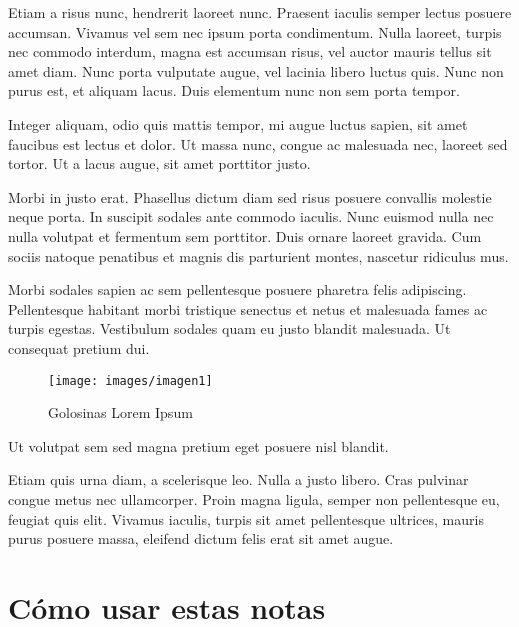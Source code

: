 \documentclass[12pt,a4paper]{report}
\begin{document}
Etiam a risus nunc, hendrerit laoreet nunc. Praesent iaculis semper lectus posuere accumsan. Vivamus vel sem nec ipsum porta condimentum. Nulla laoreet, turpis nec commodo interdum, magna est accumsan risus, vel auctor mauris tellus sit amet diam. Nunc porta vulputate augue, vel lacinia libero luctus quis. Nunc non purus est, et aliquam lacus. Duis elementum nunc non sem porta tempor.

Integer aliquam, odio quis mattis tempor, mi augue luctus sapien, sit amet faucibus est lectus et dolor. Ut massa nunc, congue ac malesuada nec, laoreet sed tortor. Ut a lacus augue, sit amet porttitor justo. 

Morbi in justo erat. Phasellus dictum diam sed risus posuere convallis molestie neque porta. In suscipit sodales ante commodo iaculis. Nunc euismod nulla nec nulla volutpat et fermentum sem porttitor. Duis ornare laoreet gravida. Cum sociis natoque penatibus et magnis dis parturient montes, nascetur ridiculus mus. 

Morbi sodales sapien ac sem pellentesque posuere pharetra felis adipiscing. Pellentesque habitant morbi tristique senectus et netus et malesuada fames ac turpis egestas. Vestibulum sodales quam eu justo blandit malesuada. Ut consequat pretium dui. 





\begin{figure}[h]
\centering
\texttt{[image: images/imagen1]}
\caption{Golosinas Lorem Ipsum}
\label{figure.golosinas}
\end{figure}





Ut volutpat sem sed magna pretium eget posuere nisl blandit.

Etiam quis urna diam, a scelerisque leo. Nulla a justo libero. Cras pulvinar congue metus nec ullamcorper. Proin magna ligula, semper non pellentesque eu, feugiat quis elit. Vivamus iaculis, turpis sit amet pellentesque ultrices, mauris purus posuere massa, eleifend dictum felis erat sit amet augue. 




\section{Cómo usar estas notas}
\label{seccion.uso}
\end{document}
